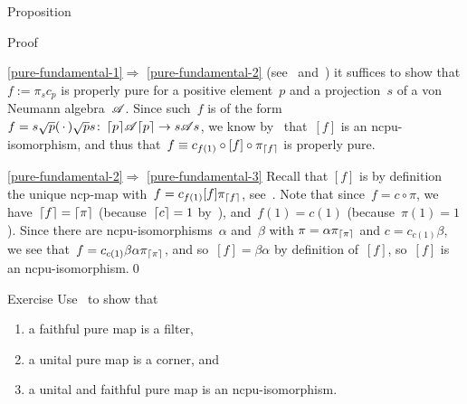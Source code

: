 \documentclass[a]{subfiles}
\begin{document}
\begin{parsec}
\begin{point}{Proposition}
\begin{point}{Proof}
\begin{point}{\ref{pure-fundamental-1}$\Longrightarrow$%
\ref{pure-fundamental-2}}
(see~
and~)
it suffices to show that
$f:=\pi_{s} c_{p}$ is properly pure
for a positive element~$p$ and a projection~$s$
of a von Neumann algebra~$\mathscr{A}$.
Since such~$f$ is of the form $f=s\sqrt{p}(\,\cdot\,)\sqrt{p}s
\colon \left\lceil p\right\rceil\!\mathscr{A}\!\left\lceil p\right\rceil\to s\mathscr{A} s$,
we know by~
that~$[f]$ is an ncpu-isomorphism,
and thus that~$f\equiv c_{f(1)}\circ [f]\circ \pi_{\left\lceil f\right\rceil}$ is properly pure.
\end{point}
\begin{point}{\ref{pure-fundamental-2}$\Longrightarrow$%
\ref{pure-fundamental-3}}%
Recall that $[f]$
is by definition the unique ncp-map
with~$f = c_{f(1)} [f] \pi_{\left\lceil f\right\rceil}$,
see~.
Note that since~$f=c\circ \pi$,
	we have~$\left\lceil f\right\rceil=\left\lceil\pi\right\rceil$ (because~$\left\lceil c\right\rceil=1$ 
	by~),
and~$f(1)=c(1)$ (because~$\pi(1)=1$).
Since there are ncpu-isomorphisms~$\alpha$ and~$\beta$
with $\pi= \alpha \pi_{\left\lceil\pi\right\rceil}$ and  $c=c_{c(1)} \beta$,
we see that~$f=c_{c(1)} \beta\alpha \pi_{\left\lceil\pi\right\rceil}$,
and so~$[f]=\beta\alpha$
by definition of~$[f]$,
so~$[f]$ is an ncpu-isomorphism.\qed
\end{point}
\end{point}
\end{point}
\begin{point}{Exercise}%
Use~ to show that 
\begin{enumerate}
\item
a faithful pure map is a filter,
\item
a unital pure map is a corner, and
\item
a unital and faithful pure map is an ncpu-isomorphism.
\end{enumerate}
\end{point}
\end{parsec}
\end{document}
